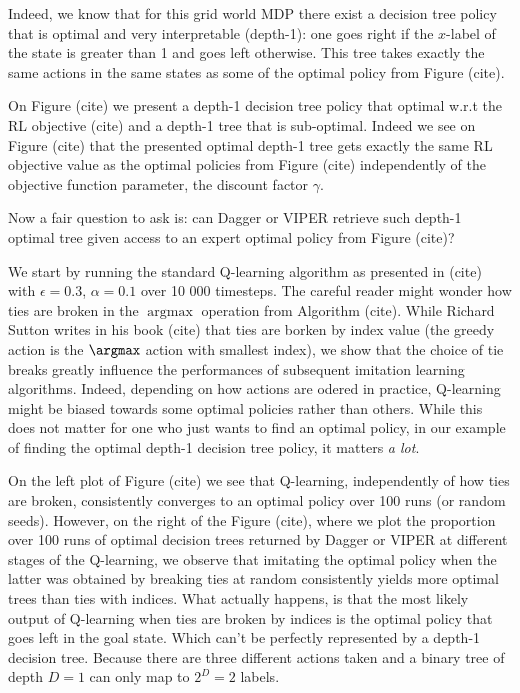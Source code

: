 Indeed, we know that for this grid world MDP there exist a decision tree policy that is optimal and very interpretable (depth-1): one goes right if the $x$-label of the state is greater than 1 and goes left otherwise.
This tree takes exactly the same actions in the same states as some of the optimal policy from Figure (cite).

On Figure (cite) we present a depth-1 decision tree policy that optimal w.r.t the RL objective (cite) and a depth-1 tree that is sub-optimal.
Indeed we see on Figure (cite) that the presented optimal depth-1 tree gets exactly the same RL objective value as the optimal policies from Figure (cite) independently of the objective function parameter, the discount factor $\gamma$.

Now a fair question to ask is: can Dagger or VIPER retrieve such depth-1 optimal tree given access to an expert optimal policy from Figure (cite)?

We start by running the standard Q-learning algorithm as presented in (cite) with $\epsilon=0.3$, $\alpha=0.1$ over 10 000 timesteps.
The careful reader might wonder how ties are broken in the $\operatorname{argmax}$ operation from Algorithm (cite).
While Richard Sutton writes in his book (cite) that ties are borken by index value (the greedy action is the $\argmax$ action with smallest index), we show that the choice of tie breaks greatly influence the performances of subsequent imitation learning algorithms.
Indeed, depending on how actions are odered in practice, Q-learning might be biased towards some optimal policies rather than others.
While this does not matter for one who just wants to find an optimal policy, in our example of finding the optimal depth-1 decision tree policy, it matters \textit{a lot}.

On the left plot of Figure (cite) we see that Q-learning, independently of how ties are broken, consistently converges to an optimal policy over 100 runs (or random seeds).
However, on the right of the Figure (cite), where we plot the proportion over 100 runs of optimal decision trees returned by Dagger or VIPER at different stages of the Q-learning, we observe that imitating the optimal policy when the latter was obtained by breaking ties at random consistently yields more optimal trees than ties with indices.
What actually happens, is that the most likely output of Q-learning when ties are broken by indices is the optimal policy that goes left in the goal state.
Which can't be perfectly represented by a depth-1 decision tree. Because there are three different actions taken and a binary tree of depth $D=1$ can only map to $2^D=2$ labels.

